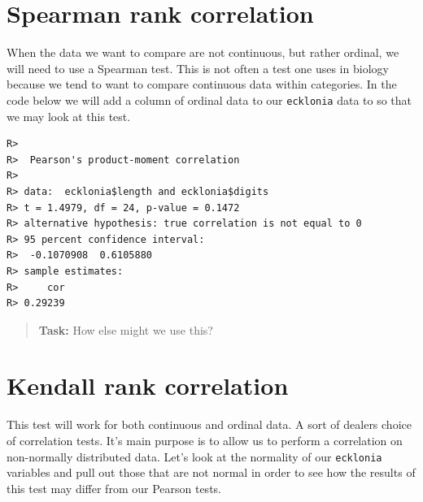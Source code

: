 \documentclass[english,10pt,a4paper,oneside]{book}
\newenvironment{Shaded}{\begin{snugshade}}{\end{snugshade}}
\newcommand{\KeywordTok}[1]{\textcolor[rgb]{0.13,0.29,0.53}{\textbf{#1}}}
\newcommand{\DataTypeTok}[1]{\textcolor[rgb]{0.13,0.29,0.53}{#1}}
\newcommand{\DecValTok}[1]{\textcolor[rgb]{0.00,0.00,0.81}{#1}}
\newcommand{\StringTok}[1]{\textcolor[rgb]{0.31,0.60,0.02}{#1}}
\newcommand{\CommentTok}[1]{\textcolor[rgb]{0.56,0.35,0.01}{\textit{#1}}}
\newcommand{\OperatorTok}[1]{\textcolor[rgb]{0.81,0.36,0.00}{\textbf{#1}}}
\newcommand{\NormalTok}[1]{#1}
\theoremstyle{definition}
\theoremstyle{definition}
\theoremstyle{definition}
\theoremstyle{remark}
\begin{document}
\section{Spearman rank correlation}\label{spearman-rank-correlation}

When the data we want to compare are not continuous, but rather ordinal,
we will need to use a Spearman test. This is not often a test one uses
in biology because we tend to want to compare continuous data within
categories. In the code below we will add a column of ordinal data to
our \texttt{ecklonia} data to so that we may look at this test.

\begin{Shaded}
\end{Shaded}

\begin{verbatim}
R> 
R>  Pearson's product-moment correlation
R> 
R> data:  ecklonia$length and ecklonia$digits
R> t = 1.4979, df = 24, p-value = 0.1472
R> alternative hypothesis: true correlation is not equal to 0
R> 95 percent confidence interval:
R>  -0.1070908  0.6105880
R> sample estimates:
R>     cor 
R> 0.29239
\end{verbatim}

\begin{quote}
\textbf{Task:} How else might we use this?
\end{quote}

\section{Kendall rank correlation}\label{kendall-rank-correlation}

This test will work for both continuous and ordinal data. A sort of
dealers choice of correlation tests. It's main purpose is to allow us to
perform a correlation on non-normally distributed data. Let's look at
the normality of our \texttt{ecklonia} variables and pull out those that
are not normal in order to see how the results of this test may differ
from our Pearson tests.
\end{document}
